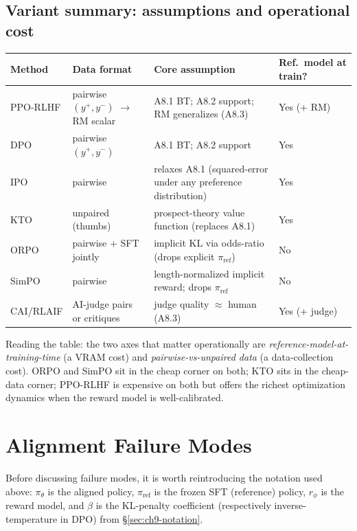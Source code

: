 \subsection{Variant summary: assumptions and operational cost}

\begin{center}
\small
\begin{tabular}{|l|p{3.4cm}|p{3.3cm}|p{3.3cm}|}
\hline
\textbf{Method} & \textbf{Data format} & \textbf{Core assumption} & \textbf{Ref.\ model at train?}\\\hline
PPO-RLHF & pairwise $(y^+, y^-)$ $\to$ RM scalar & A8.1 BT; A8.2 support; RM generalizes (A8.3) & Yes (+ RM) \\
DPO & pairwise $(y^+, y^-)$ & A8.1 BT; A8.2 support & Yes \\
IPO \citep{azar2023general} & pairwise & relaxes A8.1 (squared-error under any preference distribution) & Yes \\
KTO \citep{ethayarajh2024kto} & unpaired (thumbs) & prospect-theory value function (replaces A8.1) & Yes \\
ORPO \citep{hong2024orpo} & pairwise + SFT jointly & implicit KL via odds-ratio (drops explicit $\pi_{\mathrm{ref}}$) & No \\
SimPO \citep{meng2024simpo} & pairwise & length-normalized implicit reward; drops $\pi_{\mathrm{ref}}$ & No \\
CAI/RLAIF & AI-judge pairs or critiques & judge quality $\approx$ human (A8.3) & Yes (+ judge) \\
\hline
\end{tabular}
\end{center}

Reading the table: the two axes that matter operationally are
\emph{reference-model-at-training-time} (a VRAM cost) and
\emph{pairwise-vs-unpaired data} (a data-collection cost). ORPO and
SimPO sit in the cheap corner on both; KTO sits in the cheap-data
corner; PPO-RLHF is expensive on both but offers the richest
optimization dynamics when the reward model is well-calibrated.

\section{Alignment Failure Modes}

Before discussing failure modes, it is worth reintroducing the
notation used above: $\pi_\theta$ is the aligned policy,
$\pi_{\mathrm{ref}}$ is the frozen SFT (reference) policy, $r_\phi$
is the reward model, and $\beta$ is the KL-penalty coefficient
(respectively inverse-temperature in DPO) from
\S\ref{sec:ch9-notation}.

